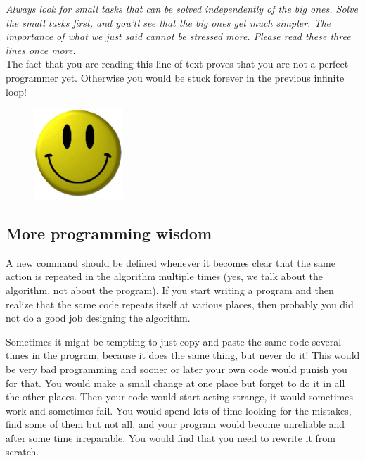 \documentclass[article,A4,12pt]{llncs}
\begin{document}
{\em Always look for small tasks that can be solved independently of the big ones.
Solve the small tasks first, and you'll see that the big ones get much simpler. The 
importance of what we just said cannot be stressed more. Please read these three 
lines once more.}\\

\noindent
The fact that you are reading this line of text proves that you are not 
a perfect programmer yet. Otherwise you would be stuck forever in the 
previous infinite loop!

\begin{figure}[!ht]
\begin{center}
\includegraphics[width=0.3\textwidth]{img/smiley.png}
\end{center}
\vspace{-1cm}
\end{figure}


\subsection{More programming wisdom}

A new command should be defined whenever it becomes clear that the same 
action is repeated in the algorithm multiple times (yes, we talk about the algorithm,
not about the program). If you start writing a program and then realize that the same
code repeats itself at various places, then probably you did not do a good job 
designing the algorithm.

Sometimes it might be 
tempting to just copy and paste the same code several times in the 
program, because it does the same thing, but never do it! This would be very bad programming
and sooner or later your own code would punish you for that. 
You would make a small change at one place but forget to do it 
in all the other places. Then your code would start 
acting strange, it would sometimes work and sometimes fail. 
You would spend lots of time looking for the mistakes, find some 
of them but not all, and your program would become unreliable
and after some time irreparable. You would find that you need to 
rewrite it from scratch.
\end{document}
